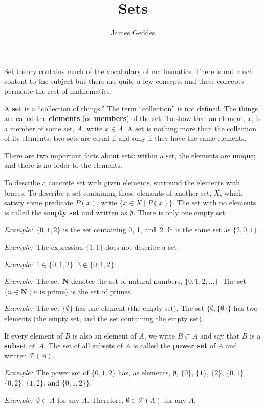 \documentclass[12pt, a4paper]{article}
\title{\vspace{-6ex}Sets}
\author{James Geddes}
\newcommand{\defn}[1]{\textbf{#1}}
\newcommand{\set}[1]{\mathbold{#1}}
\newcommand{\eg}{\emph{Example:}\relax}
\begin{document}
\maketitle
Set theory contains much of the vocabulary of
mathematics. There is not much content to the subject but there are
quite a few concepts and these concepts permeate the rest of
mathematics.

A \defn{set} is a “collection of things.” The term “collection” is not
defined. The things are called the \defn{elements} (or \defn{members})
of the set. To show that an element, $x$, is a member of some set,
$A$, write $x \in A$. A set is nothing more than the collection of its
elements: two sets are equal if and only if they have the same elements.

There are two important facts about sets: within a set, the elements
are unique; and there is no order to the elements.

To describe a concrete set with given elements, surround the elements with
braces. To describe a set containing those elements of another set, $X$, which
satisfy some predicate $P(x)$, write $\{x \in X \mid P(x)\}$. The set with no
elements is called the \defn{empty set} and written as $\emptyset$. There is only one
empty set.

\eg\ $\{0, 1, 2\}$ is the set containing 0, 1, and~2. It is the same
set as $\{2,0,1\}$.

\eg\ The expression $\{1, 1\}$ does not describe a set.

\eg\ $1\in\{0,1,2\}$. $3\notin\{0,1,2\}$.

\eg\ The set $\set{N}$ denotes the set of natural numbers,
$\{0,1,2,\dotsc\}$. The set $\{n \in \set{N} \mid \text{$n$ is prime}\}$ is
the set of primes.

\eg\ The set $\{\emptyset\}$ has one element (the empty set). The set $\{\emptyset,
\{\emptyset\}\}$ has two elements (the empty set, and the set containing the
empty set).

If every element of $B$ is also an element of $A$, we write $B \subset A$
and say that $B$ is a \defn{subset} of~$A$. The set of all subsets of
$A$ is called the \defn{power set} of $A$ and written $\mathcal{P}(A)$.

\eg\ The power set of $\{0,1,2\}$ has, as elements, $\emptyset$, $\{0\}$,
$\{1\}$, $\{2\}$, $\{0,1\}$, $\{0,2\}$, $\{1,2\}$, and $\{0,1,2\}\}$.

\eg\ $\emptyset \subset A$ for any $A$. Therefore, $\emptyset \in \mathcal{P}(A)$ for any $A$. 
\end{document}
